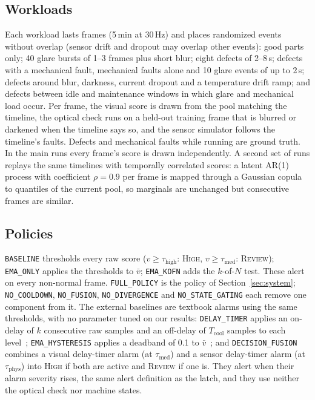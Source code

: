 \documentclass[conference]{IEEEtran}
\begin{document}
\subsection{Workloads}
Each workload lasts \StepsPerRun{} frames (5\,min at 30\,Hz) and places randomized events without overlap (sensor drift and dropout may overlap other events): good parts only; 40 glare bursts of 1--3 frames plus short blur; eight defects of 2--8\,s; defects with a mechanical fault, mechanical faults alone and 10 glare events of up to 2\,s; defects around blur, darkness, current dropout and a temperature drift ramp; and defects between idle and maintenance windows in which glare and mechanical load occur. Per frame, the visual score is drawn from the pool matching the timeline, the optical check runs on a held-out training frame that is blurred or darkened when the timeline says so, and the sensor simulator follows the timeline's faults. Defects and mechanical faults while running are ground truth. In the main runs every frame's score is drawn independently. A second set of \TotalRunsRho{} runs replays the same timelines with temporally correlated scores: a latent AR(1) process with coefficient $\rho = 0.9$ per frame is mapped through a Gaussian copula to quantiles of the current pool, so marginals are unchanged but consecutive frames are similar.

\subsection{Policies}
\texttt{BASELINE} thresholds every raw score ($v\ge\tau_{\text{high}}$: \textsc{High}, $v\ge\tau_{\text{med}}$: \textsc{Review}); \texttt{EMA\_ONLY} applies the thresholds to $\bar v$; \texttt{EMA\_KOFN} adds the $k$-of-$N$ test. These alert on every non-normal frame. \texttt{FULL\_POLICY} is the policy of Section~\ref{sec:system}; \texttt{NO\_COOLDOWN}, \texttt{NO\_FUSION}, \texttt{NO\_DIVERGENCE} and \texttt{NO\_STATE\_GATING} each remove one component from it. The external baselines are textbook alarms using the same thresholds, with no parameter tuned on our results: \texttt{DELAY\_TIMER} applies an on-delay of $k$ consecutive raw samples and an off-delay of $T_{\text{cool}}$ samples to each level~\cite{isa182,adnan2013generalized}; \texttt{EMA\_HYSTERESIS} applies a deadband of 0.1 to $\bar v$~\cite{afzal2018deadband}; and \texttt{DECISION\_FUSION} combines a visual delay-timer alarm (at $\tau_{\text{med}}$) and a sensor delay-timer alarm (at $\tau_{\text{phys}}$) into \textsc{High} if both are active and \textsc{Review} if one is. They alert when their alarm severity rises, the same alert definition as the latch, and they use neither the optical check nor machine states.
\end{document}
